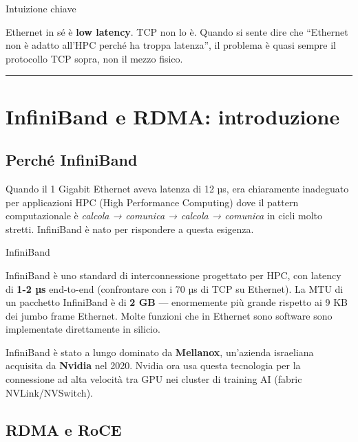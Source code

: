 \documentclass[
  italian,
  openany]{book}
\begin{document}
\begin{callouttip}{Intuizione chiave}

Ethernet in sé è \textbf{low latency}. TCP non lo è. Quando si sente
dire che ``Ethernet non è adatto all'HPC perché ha troppa latenza'', il
problema è quasi sempre il protocollo TCP sopra, non il mezzo fisico.

\end{callouttip}

\begin{center}\rule{0.5\linewidth}{0.5pt}\end{center}

\section{InfiniBand e RDMA:
introduzione}\label{infiniband-e-rdma-introduzione}

\subsection{Perché InfiniBand}\label{perchuxe9-infiniband}

Quando il 1 Gigabit Ethernet aveva latenza di 12 µs, era chiaramente
inadeguato per applicazioni HPC (High Performance Computing) dove il
pattern computazionale è \emph{calcola → comunica → calcola → comunica}
in cicli molto stretti. InfiniBand è nato per rispondere a questa
esigenza.

\begin{calloutdefinition}{InfiniBand}

InfiniBand è uno standard di interconnessione progettato per HPC, con
latency di \textbf{1-2 µs} end-to-end (confrontare con i 70 µs di TCP su
Ethernet). La MTU di un pacchetto InfiniBand è di \textbf{2 GB} ---
enormemente più grande rispetto ai 9 KB dei jumbo frame Ethernet. Molte
funzioni che in Ethernet sono software sono implementate direttamente in
silicio.

\end{calloutdefinition}

InfiniBand è stato a lungo dominato da \textbf{Mellanox}, un'azienda
israeliana acquisita da \textbf{Nvidia} nel 2020. Nvidia ora usa questa
tecnologia per la connessione ad alta velocità tra GPU nei cluster di
training AI (fabric NVLink/NVSwitch).

\subsection{RDMA e RoCE}\label{rdma-e-roce}
\end{document}

